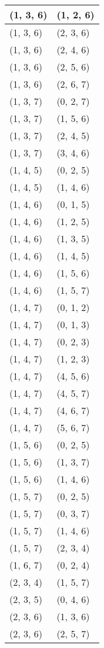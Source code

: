 \begin{footnotesize}
\begin{longtable}[c]{|l|l|}
(1, 3, 6)
&(1, 2, 6)
\\ \hline
(1, 3, 6)
&(2, 3, 6)
\\ \hline
(1, 3, 6)
&(2, 4, 6)
\\ \hline
(1, 3, 6)
&(2, 5, 6)
\\ \hline
(1, 3, 6)
&(2, 6, 7)
\\ \hline
(1, 3, 7)
&(0, 2, 7)
\\ \hline
(1, 3, 7)
&(1, 5, 6)
\\ \hline
(1, 3, 7)
&(2, 4, 5)
\\ \hline
(1, 3, 7)
&(3, 4, 6)
\\ \hline
(1, 4, 5)
&(0, 2, 5)
\\ \hline
(1, 4, 5)
&(1, 4, 6)
\\ \hline
(1, 4, 6)
&(0, 1, 5)
\\ \hline
(1, 4, 6)
&(1, 2, 5)
\\ \hline
(1, 4, 6)
&(1, 3, 5)
\\ \hline
(1, 4, 6)
&(1, 4, 5)
\\ \hline
(1, 4, 6)
&(1, 5, 6)
\\ \hline
(1, 4, 6)
&(1, 5, 7)
\\ \hline
(1, 4, 7)
&(0, 1, 2)
\\ \hline
(1, 4, 7)
&(0, 1, 3)
\\ \hline
(1, 4, 7)
&(0, 2, 3)
\\ \hline
(1, 4, 7)
&(1, 2, 3)
\\ \hline
(1, 4, 7)
&(4, 5, 6)
\\ \hline
(1, 4, 7)
&(4, 5, 7)
\\ \hline
(1, 4, 7)
&(4, 6, 7)
\\ \hline
(1, 4, 7)
&(5, 6, 7)
\\ \hline
(1, 5, 6)
&(0, 2, 5)
\\ \hline
(1, 5, 6)
&(1, 3, 7)
\\ \hline
(1, 5, 6)
&(1, 4, 6)
\\ \hline
(1, 5, 7)
&(0, 2, 5)
\\ \hline
(1, 5, 7)
&(0, 3, 7)
\\ \hline
(1, 5, 7)
&(1, 4, 6)
\\ \hline
(1, 5, 7)
&(2, 3, 4)
\\ \hline
(1, 6, 7)
&(0, 2, 4)
\\ \hline
(2, 3, 4)
&(1, 5, 7)
\\ \hline
(2, 3, 5)
&(0, 4, 6)
\\ \hline
(2, 3, 6)
&(1, 3, 6)
\\ \hline
(2, 3, 6)
&(2, 5, 7)
\\ \hline

\end{longtable}
\end{footnotesize}
